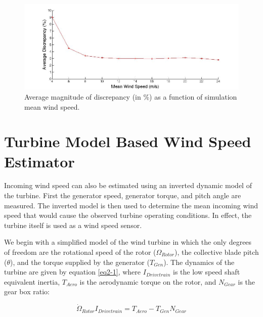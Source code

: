 \begin{figure}[htbp]
	\centering
		\includegraphics[width = \linewidth]{Figures/ch2Figures/fig2-12.jpg}
		
	\caption{Average magnitude of discrepancy (in \%) as a function of simulation mean wind speed.}
	\label{fig2-12}
\end{figure}




\section{Turbine Model Based Wind Speed Estimator} \label{section2-4} 

Incoming wind speed can also be estimated using an inverted dynamic model of the turbine.  First the generator speed, generator torque, and pitch angle are measured.  The inverted model is then used to determine the mean incoming wind speed that would cause the observed turbine operating conditions.  In effect, the turbine itself is used as a wind speed sensor.\cite{ostergaard2007,vanderhooft2004,schlipf2014}

We begin with a simplified model of the wind turbine in which the only degrees of freedom are the rotational speed of the rotor ($\Omega _{Rotor}$), the collective blade pitch ($\theta$), and the torque supplied by the generator ($T_{Gen}$).  The dynamics of the turbine are given by equation \ref{eq2-1}, where $I_{Drivetrain}$ is the low speed shaft equivalent inertia, $T_{Aero}$ is the aerodynamic torque on the rotor, and $N_{Gear}$ is the gear box ratio:

\begin{equation}
	\dot{\Omega }_{Rotor}I_{Drivetrain}=T_{Aero}-T_{Gen}N_{Gear} \label{eq2-1}
\end{equation}

